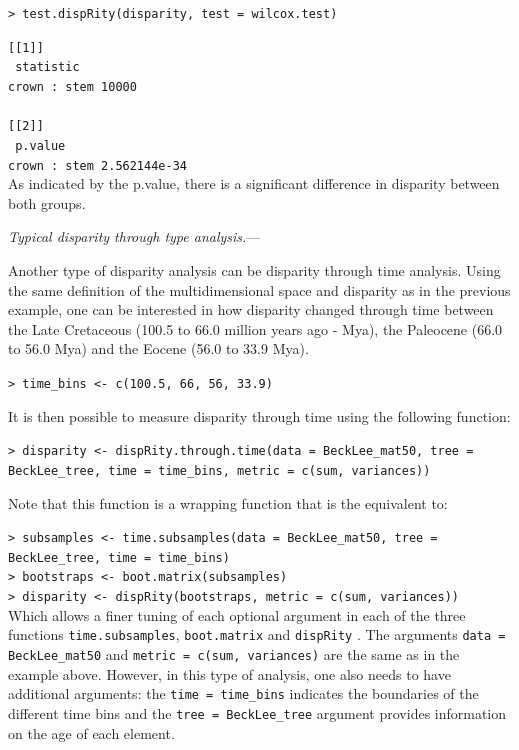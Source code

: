 \documentclass[12pt,letterpaper]{article}
\renewcommand{\subsubsection}[1]{%
\vspace{2ex}
\noindent
\textit{#1.}---}
\newcommand{\disp}{\texttt{dispRity} }
\begin{document}
\texttt{> test.dispRity(disparity, test = wilcox.test)}

\noindent \texttt{[[1]]}\\
\noindent \texttt{             statistic}\\
\noindent \texttt{crown : stem     10000}\\
\noindent \texttt{ }\\
\noindent \texttt{[[2]]}\\
\noindent \texttt{                  p.value}\\
\noindent \texttt{crown : stem 2.562144e-34}\\

\bigskip
As indicated by the p.value, there is a significant difference in disparity between both groups.

\subsubsection{Typical disparity through type analysis}

Another type of disparity analysis can be disparity through time analysis.
Using the same definition of the multidimensional space and disparity as in the previous example, one can be interested in how disparity changed through time between the Late Cretaceous (100.5 to 66.0 million years ago - Mya), the Paleocene (66.0 to 56.0 Mya) and the Eocene (56.0 to 33.9 Mya).

\texttt{> time\_bins <- c(100.5, 66, 56, 33.9)}

It is then possible to measure disparity through time using the following function:

\texttt{> disparity <- dispRity.through.time(data = BeckLee\_mat50, tree = BeckLee\_tree, time = time\_bins, metric = c(sum, variances))}

\noindent Note that this function is a wrapping function that is the equivalent to:

\texttt{> subsamples <- time.subsamples(data = BeckLee\_mat50, tree = BeckLee\_tree, time = time\_bins)}\\
\texttt{> bootstraps <- boot.matrix(subsamples)}\\
\texttt{> disparity <- dispRity(bootstraps, metric = c(sum, variances))}\\

\noindent Which allows a finer tuning of each optional argument in each of the three functions \texttt{time.subsamples}, \texttt{boot.matrix} and \disp.
The arguments \texttt{data = BeckLee\_mat50} and \texttt{metric = c(sum, variances)} are the same as in the example above.
However, in this type of analysis, one also needs to have additional arguments: the \texttt{time = time\_bins} indicates the boundaries of the different time bins and the \texttt{tree = BeckLee\_tree} argument provides information on the age of each element.
\end{document}
